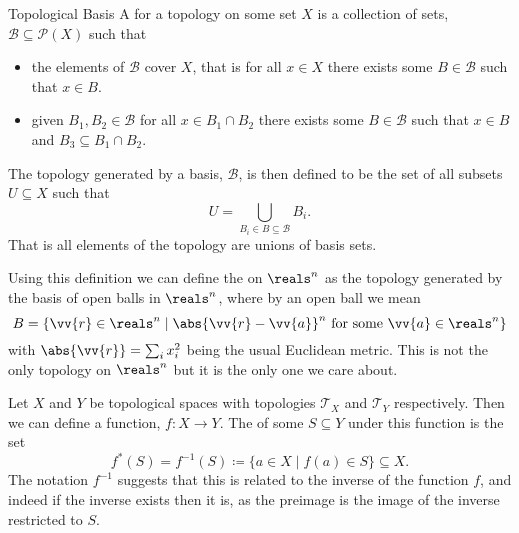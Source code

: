 \begin{dfn}{Topological Basis}{}
    A  for a topology on some set \(X\) is a collection of sets, \(\mathcal{B} \subseteq \mathcal{P}(X)\) such that
    \begin{itemize}
        \item the elements of \(\mathcal{B}\) cover \(X\), that is for all \(x \in X\) there exists some \(B \in \mathcal{B}\) such that \(x \in B\).
        \item given \(B_1, B_2 \in \mathcal{B}\) for all \(x \in B_1 \cap B_2\) there exists some \(B \in \mathcal{B}\) such that \(x \in B\) and \(B_3 \subseteq B_1 \cap B_2\).
    \end{itemize}
    The topology generated by a basis, \(\mathcal{B}\), is then defined to be the set of all subsets \(U \subseteq X\) such that\vspace{-0.5ex}
    \begin{equation}
        U = \bigcup_{B_i \in B \subseteq \mathcal{B}} B_i.
    \end{equation}\vspace{-0.5ex}
    That is all elements of the topology are unions of basis sets.
\end{dfn}

Using this definition we can define the  on \(\reals^n\) as the topology generated by the basis of open balls in \(\reals^n\), where by an open ball we mean
\begin{equation}
    B = \{\vv{r} \in \reals^n \mid \abs{\vv{r} - \vv{a}}^{n} \text{ for some } \vv{a} \in \reals^n\}
\end{equation}
with \(\abs{\vv{r}} = \sum_i x_i^2\) being the usual Euclidean metric.
This is not the only topology on \(\reals^n\) but it is the only one we care about.

Let \(X\) and \(Y\) be topological spaces with topologies \(\mathcal{T}_X\) and \(\mathcal{T}_Y\) respectively.
Then we can define a function, \(f \colon X \to Y\).
The  of some \(S \subseteq Y\) under this function is the set
\begin{equation}
    f^*(S) = f^{-1}(S) \coloneqq \{a \in X \mid f(a) \in S\} \subseteq X.
\end{equation}
The notation \(f^{-1}\) suggests that this is related to the inverse of the function \(f\), and indeed if the inverse exists then it is, as the preimage is the image of the inverse restricted to \(S\).

